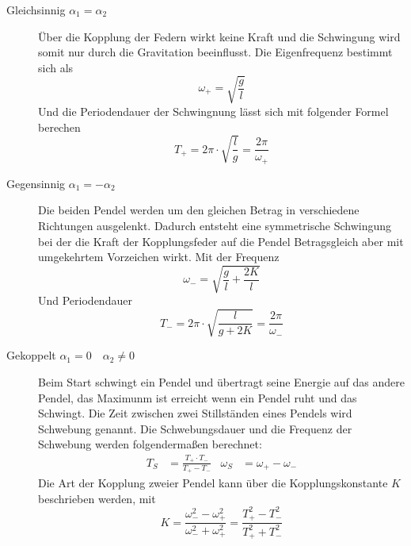 \begin{description}
    \item[Gleichsinnig $\alpha_1 = \alpha_2$]
        Über die Kopplung der Federn wirkt keine Kraft und die Schwingung wird somit nur durch die Gravitation beeinflusst.
        Die Eigenfrequenz bestimmt sich als
        \begin{equation}
            \omega_+ = \sqrt{\frac{g}{l}} \label{eqn:w_p}
        \end{equation}
        Und die Periodendauer der Schwingnung lässt sich mit folgender Formel berechen 
        \begin{equation}
            T_+ = 2\pi \cdot \sqrt{\frac{l}{g}} = \frac{2\pi}{\omega_+} \label{eqn:T_p}
        \end{equation}
    \item[Gegensinnig $\alpha_1 = -\alpha_2$]
        Die beiden Pendel werden um den gleichen Betrag in verschiedene Richtungen ausgelenkt.
        Dadurch entsteht eine symmetrische Schwingung bei der die Kraft der Kopplungsfeder auf die Pendel Betragsgleich aber mit umgekehrtem Vorzeichen wirkt.
        Mit der Frequenz
        \begin{equation}
            \omega_- = \sqrt{\frac{g}{l}+\frac{2K}{l}}\label{eqn:w_m}
        \end{equation}
        Und Periodendauer
        \begin{equation}
            T_- = 2\pi \cdot \sqrt{\frac{l}{g+2K}} = \frac{2\pi}{\omega_-}\label{eqn:T_m}
        \end{equation}
    \item[Gekoppelt $\alpha_1 =0 \quad \alpha_2 \neq 0$]
        Beim Start schwingt ein Pendel und übertragt seine Energie auf das andere Pendel, das Maximunm ist erreicht wenn ein Pendel ruht und das Schwingt.
        Die Zeit zwischen zwei Stillständen eines Pendels wird Schwebung genannt.
        Die Schwebungsdauer und die Frequenz der Schwebung werden folgendermaßen berechnet:
        \begin{align}
            T_S &= \frac{T_+ \cdot T_-}{T_+ - T_-}  & \omega_S &= \omega_+ - \omega_- \label{eqn:Schwebung}
        \end{align}
        Die Art der Kopplung zweier Pendel kann über die Kopplungskonstante $K$ beschrieben werden, mit
        \begin{equation}
            K = \frac{\omega_-^2 - \omega_+^2}{\omega_-^2 + \omega_+^2} = \frac{T_+^2 - T_-^2}{T_+^2 + T_-^2} \label{eqn:Kopplung}
        \end{equation}
\end{description}
